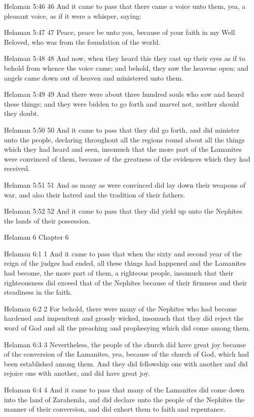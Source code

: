 Helaman 5:46
 46 And it came to pass that there came a voice unto them, yea, a
pleasant voice, as if it were a whisper, saying:

Helaman 5:47
 47 Peace, peace be unto you, because of your faith in my Well
Beloved, who was from the foundation of the world.

Helaman 5:48
 48 And now, when they heard this they cast up their eyes as if
to behold from whence the voice came; and behold, they saw the
heavens open; and angels came down out of heaven and ministered
unto them.

Helaman 5:49
 49 And there were about three hundred souls who saw and heard
these things; and they were bidden to go forth and marvel not,
neither should they doubt.

Helaman 5:50
 50 And it came to pass that they did go forth, and did minister
unto the people, declaring throughout all the regions round about
all the things which they had heard and seen, insomuch that the
more part of the Lamanites were convinced of them, because of the
greatness of the evidences which they had received.

Helaman 5:51
 51 And as many as were convinced did lay down their weapons of
war, and also their hatred and the tradition of their fathers.

Helaman 5:52
 52 And it came to pass that they did yield up unto the Nephites
the lands of their possession.

Helaman 6
Chapter 6

Helaman 6:1
 1 And it came to pass that when the sixty and second year of the
reign of the judges had ended, all these things had happened and
the Lamanites had become, the more part of them, a righteous
people, insomuch that their righteousness did exceed that of the
Nephites because of their firmness and their steadiness in the
faith.

Helaman 6:2
 2 For behold, there were many of the Nephites who had become
hardened and impenitent and grossly wicked, insomuch that they
did reject the word of God and all the preaching and prophesying
which did come among them.

Helaman 6:3
 3 Nevertheless, the people of the church did have great joy
because of the conversion of the Lamanites, yea, because of the
church of God, which had been established among them. And they
did fellowship one with another and did rejoice one with another,
and did have great joy.

Helaman 6:4
 4 And it came to pass that many of the Lamanites did come down
into the land of Zarahemla, and did declare unto the people of
the Nephites the manner of their conversion, and did exhort them
to faith and repentance.

